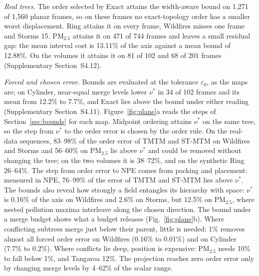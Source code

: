 \emph{Real trees.} The order selected by Exact attains the width-aware bound on 1,271 of 1,560 planar frames, so on these frames no exact-topology order has a smaller worst displacement. Ring attains it on every frame, Wildfires misses one frame and Storms 15. PM$_{2.5}$ attains it on 471 of 744 frames and leaves a small residual gap: the mean interval cost is 13.11\% of the axis against a mean bound of 12.88\%. On the volumes it attains it on 81 of 102 and 68 of 201 frames (Supplementary Section~S4.12).

\emph{Forced and chosen error.} Bounds are evaluated at the tolerance $\varepsilon_0$, as the maps are; on Cylinder, near-equal merge levels lower $\nu^*$ in 34 of 102 frames and its mean from 12.2\% to 7.7\%, and Exact lies above the bound under either reading (Supplementary Section~S4.11). Figure~\ref{fig:plane}a reads the steps of Section~\ref{sec:bounds} for each map. Midpoint ordering attains $\nu^*$ on the same tree, so the step from $\nu^*$ to the order error is chosen by the order rule. On the real-data sequences, 83--98\% of the order error of TMTM and ST-MTM on Wildfires and Storms and 56--60\% on PM$_{2.5}$ lie above $\nu^*$ and could be removed without changing the tree; on the two volumes it is 38--72\%, and on the synthetic Ring 26--64\%. The step from order error to NPE comes from packing and placement: measured in NPE, 76--99\% of the error of TMTM and ST-MTM lies above $\nu^*$. The bounds also reveal how strongly a field entangles its hierarchy with space: $\nu^*$ is 0.16\% of the axis on Wildfires and 2.6\% on Storms, but 12.5\% on PM$_{2.5}$, where nested pollution maxima interleave along the chosen direction. The bound under a merge budget shows what a budget releases (Fig.~\ref{fig:plane}b). Where conflicting subtrees merge just below their parent, little is needed: 1\% removes almost all forced order error on Wildfires (0.16\% to 0.01\%) and on Cylinder (7.7\% to 0.2\%). Where conflicts lie deep, position is expensive: PM$_{2.5}$ needs 10\% to fall below 1\%, and Tangaroa 12\%. The projection reaches zero order error only by changing merge levels by 4--62\% of the scalar range.

